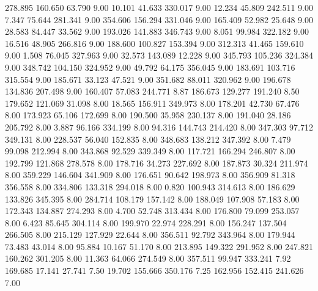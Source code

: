 278.895  160.650   63.790         9.00
  10.101   41.633  330.017         9.00
  12.234   45.809  242.511         9.00
   7.347   75.644  281.341         9.00
 354.606  156.294  331.046         9.00
 165.409   52.982   25.648         9.00
  28.583   84.447   33.562         9.00
 193.026  141.883  346.743         9.00
   8.051   99.984  322.182         9.00
  16.516   48.905  266.816         9.00
 188.600  100.827  153.394         9.00
 312.313   41.465  159.610         9.00
   1.508   76.045  327.963         9.00
  32.573  143.089   12.228         9.00
 345.793  105.236  324.384         9.00
 348.742  104.150  324.952         9.00
  49.792   64.175  356.045         9.00
 183.691  103.716  315.554         9.00
 185.671   33.123   47.521         9.00
 351.682   88.011  320.962         9.00
 196.678  134.836  207.498         9.00
 160.407   57.083  244.771         8.87
 186.673  129.277  191.240         8.50
 179.652  121.069   31.098         8.00
  18.565  156.911  349.973         8.00
 178.201   42.730   67.476         8.00
 173.923   65.106  172.699         8.00
 190.500   35.958  230.137         8.00
 191.040   28.186  205.792         8.00
   3.887   96.166  334.199         8.00
  94.316  144.743  214.420         8.00
 347.303   97.712  349.131         8.00
 228.537   56.040  152.835         8.00
 348.683  138.212  347.392         8.00
   7.479   99.098  212.994         8.00
 343.868   92.529  339.349         8.00
 117.721  166.294  246.807         8.00
 192.799  121.868  278.578         8.00
 178.716   34.273  227.692         8.00
 187.873   30.324  211.974         8.00
 359.229  146.604  341.909         8.00
 176.651   90.642  198.973         8.00
 356.909   81.318  356.558         8.00
 334.806  133.318  294.018         8.00
   0.820  100.943  314.613         8.00
 186.629  133.826  345.395         8.00
 284.714  108.179  157.142         8.00
 188.049  107.908   57.183         8.00
 172.343  134.887  274.293         8.00
   4.700   52.748  313.434         8.00
 176.800   79.099  253.057         8.00
   6.423   85.645  304.114         8.00
 199.970   22.974  228.291         8.00
 156.247  137.504  266.505         8.00
 215.129  127.929   22.644         8.00
 356.511   92.792  343.964         8.00
 179.944   73.483   43.014         8.00
  95.884   10.167   51.170         8.00
 213.895  149.322  291.952         8.00
 247.821  160.262  301.205         8.00
  11.363   64.066  274.549         8.00
 357.511   99.947  333.241         7.92
 169.685   17.141   27.741         7.50
  19.702  155.666  350.176         7.25
 162.956  152.415  241.626         7.00
